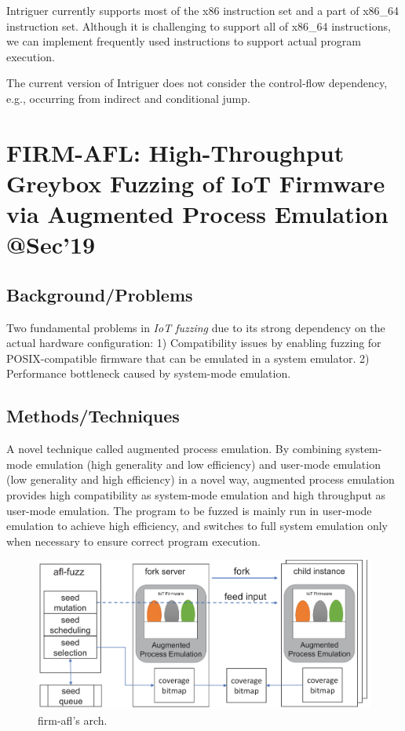 Intriguer currently supports most of the x86 instruction set and a part of x86\_64 instruction set. Although it is challenging to support all of x86\_64 instructions, we can implement frequently used instructions to support actual program execution.

The current version of Intriguer does not consider the control-flow dependency, e.g., occurring from indirect
and conditional jump.
\newpage

\section{FIRM-AFL: High-Throughput Greybox Fuzzing of IoT Firmware via Augmented Process Emulation @Sec'19}
\subsection{Background/Problems}
Two fundamental problems in \emph{IoT fuzzing} due to its strong dependency on the actual
hardware configuration:
1) Compatibility issues by enabling fuzzing for
POSIX-compatible firmware that can be emulated in a system
emulator. 2) Performance bottleneck
caused by system-mode emulation. 
\subsection{Methods/Techniques}
A novel technique
called augmented process emulation. By combining system-
mode emulation  (high generality and low
efficiency)  and user-mode emulation  (low generality and
high efficiency) in a novel way,
augmented process emulation provides high compatibility as
system-mode emulation and high throughput as user-mode
emulation.  The program to be fuzzed is mainly
run in user-mode emulation to achieve high efficiency, and
switches to full system emulation only when necessary to
ensure correct program execution. 
\begin{figure}[h]
    \centering
    \includegraphics[width=\linewidth]{firm-afl.png} %
    \caption{firm-afl's arch.}	
    \label{fig:firmafl}
\end{figure}
